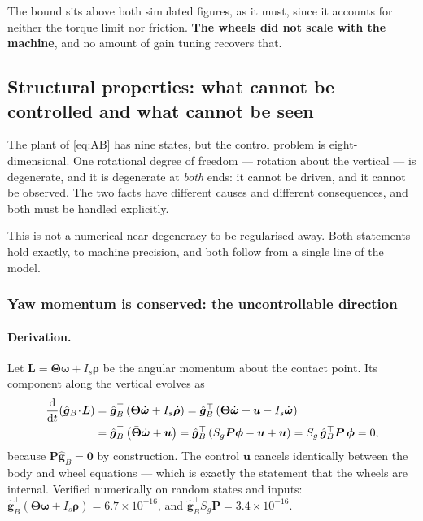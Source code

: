 The bound sits above both simulated figures, as it must, since it accounts
for neither the torque limit nor friction. \textbf{The wheels did not scale
with the machine}, and no amount of gain tuning recovers that.

\subsection{Structural properties: what cannot be controlled and what cannot be seen}
\label{sec:structural}

The plant of \eqref{eq:AB} has nine states, but the control problem is
eight-dimensional. One rotational degree of freedom --- rotation about the
vertical --- is degenerate, and it is degenerate at \emph{both} ends: it
cannot be driven, and it cannot be observed. The two facts have different
causes and different consequences, and both must be handled explicitly.

This is not a numerical near-degeneracy to be regularised away. Both
statements hold exactly, to machine precision, and both follow from a single
line of the model.

\subsubsection{Yaw momentum is conserved: the uncontrollable direction}
\label{sec:uncontrollable}

\paragraph{Derivation.} Let $\bm{L} = \bm{\Theta}\bm{\omega} +
I_s\bm{\rho}$ be the angular momentum about the contact point. Its component
along the vertical evolves as
%
\begin{align}
  \frac{\mathrm{d}}{\mathrm{d}t}\!\left(\hat{\bm{g}}_B\!\cdot\!\bm{L}\right)
  &= \hat{\bm{g}}_B^{\top}
     \left(\bm{\Theta}\dot{\bm{\omega}} + I_s\dot{\bm{\rho}}\right)
   = \hat{\bm{g}}_B^{\top}
     \left(\bm{\Theta}\dot{\bm{\omega}} + \bm{u} - I_s\dot{\bm{\omega}}\right)
   \notag\\
  &= \hat{\bm{g}}_B^{\top}
     \left(\bar{\bm{\Theta}}\dot{\bm{\omega}} + \bm{u}\right)
   = \hat{\bm{g}}_B^{\top}
     \left(S_g\bm{P}\bm{\phi} - \bm{u} + \bm{u}\right)
   = S_g\,\hat{\bm{g}}_B^{\top}\bm{P}\,\bm{\phi}
   = 0,
  \label{eq:momentum-conservation}
\end{align}
%
because $\bm{P}\hat{\bm{g}}_B = \bm{0}$ by construction. The control $\bm{u}$
cancels identically between the body and wheel equations --- which is exactly
the statement that the wheels are internal. Verified numerically on random
states and inputs: $\hat{\bm{g}}_B^{\top}(\bm{\Theta}\dot{\bm{\omega}} +
I_s\dot{\bm{\rho}}) = 6.7\times10^{-16}$, and
$\hat{\bm{g}}_B^{\top}S_g\bm{P} = 3.4\times10^{-16}$.

